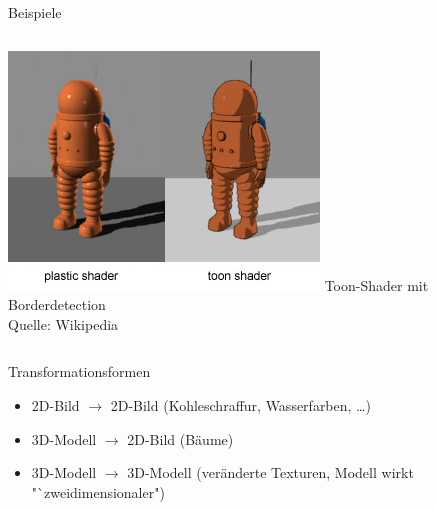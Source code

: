 \begin{frame}{Beispiele}
  \begin{columns}
	\includegraphics[width=\textwidth]{../images/Toon-shader.jpg}
	Toon-Shader mit Borderdetection\\
	Quelle: Wikipedia
  \end{columns}
\end{frame}

\begin{frame}{Transformationsformen}
	\begin{itemize}
	  \item 2D-Bild $\rightarrow$ 2D-Bild (Kohleschraffur, Wasserfarben, \ldots)
	  \item 3D-Modell $\rightarrow$ 2D-Bild (Bäume)
	  \item 3D-Modell $\rightarrow$ 3D-Modell (veränderte Texturen, Modell wirkt
	  "`zweidimensionaler")
	\end{itemize}
\end{frame}